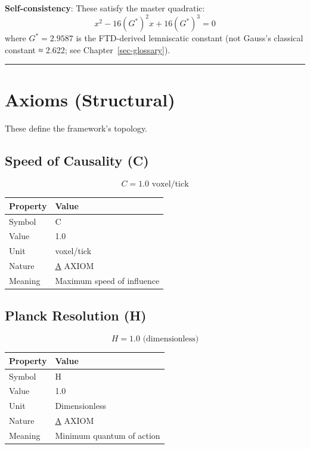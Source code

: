 \documentclass[
  11pt,
  letterpaper,
  twoside,
  openright]{book}
\begin{document}
\textbf{Self-consistency}: These satisfy the master quadratic: \[
x^2 - 16(G^*)^2 x + 16(G^*)^3 = 0
\] where \(G^* = 2.9587\) is the FTD-derived lemniscatic constant (not
Gauss's classical constant ≈ 2.622; see Chapter~\ref{sec-glossary}).

\begin{center}\rule{0.5\linewidth}{0.5pt}\end{center}

\section{Axioms (Structural)}\label{axioms-structural}

These define the framework's topology.

\subsection{Speed of Causality (C)}\label{speed-of-causality-c}

\[
C = 1.0 \text{ voxel/tick}
\]

\begin{longtable}[]{@{}ll@{}}
\toprule\noalign{}
Property & Value \\
\midrule\noalign{}
\endhead
\bottomrule\noalign{}
\endlastfoot
Symbol & C \\
Value & 1.0 \\
Unit & voxel/tick \\
Nature & \hyperref[a]{A} AXIOM \\
Meaning & Maximum speed of influence \\
\end{longtable}

\subsection{Planck Resolution (H)}\label{planck-resolution-h}

\[
H = 1.0 \text{ (dimensionless)}
\]

\begin{longtable}[]{@{}ll@{}}
\toprule\noalign{}
Property & Value \\
\midrule\noalign{}
\endhead
\bottomrule\noalign{}
\endlastfoot
Symbol & H \\
Value & 1.0 \\
Unit & Dimensionless \\
Nature & \hyperref[a]{A} AXIOM \\
Meaning & Minimum quantum of action \\
\end{longtable}
\end{document}
